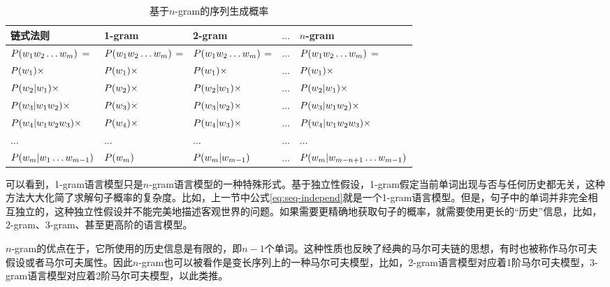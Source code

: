\begin{table}[htp]{
\begin{center}
\caption{基于$n$-gram的序列生成概率}
{\footnotesize
\begin{tabular}{l|l|l |l|l}
链式法则 & 1-gram & 2-gram & $ \ldots $ & $n$-gram\\
 \hline
\rule{0pt}{10pt} ${P}(w_1 w_2 \ldots w_m)$ = & ${P}(w_1 w_2 \ldots w_m)$ = & ${P}(w_1 w_2 \ldots w_m)$ = & $ \ldots $ & ${P}(w_1 w_2 \ldots w_m)$ = \\
\rule{0pt}{10pt} ${P}(w_1)\times$ & ${P}(w_1)\times$ & ${P}(w_1)\times$  & $ \ldots $ & ${P}(w_1)\times$ \\
\rule{0pt}{10pt} ${P}(w_2|w_1)\times$ & ${P}(w_2)\times$ & ${P}(w_2|w_1)\times$ & $ \ldots $ & ${P}(w_2|w_1)\times$\\
\rule{0pt}{10pt} ${P}(w_3|w_1 w_2)\times$ & ${P}(w_3)\times$ & ${P}(w_3|w_2)\times$ & $ \ldots $ & ${P}(w_3|w_1 w_2)\times$ \\
\rule{0pt}{10pt} ${P}(w_4|w_1 w_2 w_3)\times$ & ${P}(w_4)\times$ & ${P}(w_4|w_3)\times$ & $ \ldots $ & ${P}(w_4|w_1 w_2 w_3)\times$ \\
\rule{0pt}{10pt} $ \ldots $ & $ \ldots $ & $ \ldots $ & $ \ldots $ & $ \ldots $ \\
\rule{0pt}{10pt} ${P}(w_m|w_1  \ldots  w_{m-1})$ & ${P}(w_m)$ & ${P}(w_m|w_{m-1})$ & $ \ldots $ & ${P}(w_m|w_{m-n+1}  \ldots  w_{m-1})$
\end{tabular}
}
\label{tab:2-2}
\end{center}
}
\end{table}

\parinterval 可以看到，1-gram语言模型只是$n$-gram语言模型的一种特殊形式。基于独立性假设，1-gram假定当前单词出现与否与任何历史都无关，这种方法大大化简了求解句子概率的复杂度。比如，上一节中公式\eqref{eq:seq-independ}就是一个1-gram语言模型。但是，句子中的单词并非完全相互独立的，这种独立性假设并不能完美地描述客观世界的问题。如果需要更精确地获取句子的概率，就需要使用更长的“历史”信息，比如，2-gram、3-gram、甚至更高阶的语言模型。

\parinterval $n$-gram的优点在于，它所使用的历史信息是有限的，即$n-1$个单词。这种性质也反映了经典的马尔可夫链的思想，有时也被称作马尔可夫假设或者马尔可夫属性。因此$n$-gram也可以被看作是变长序列上的一种马尔可夫模型，比如，2-gram语言模型对应着1阶马尔可夫模型，3-gram语言模型对应着2阶马尔可夫模型，以此类推。

